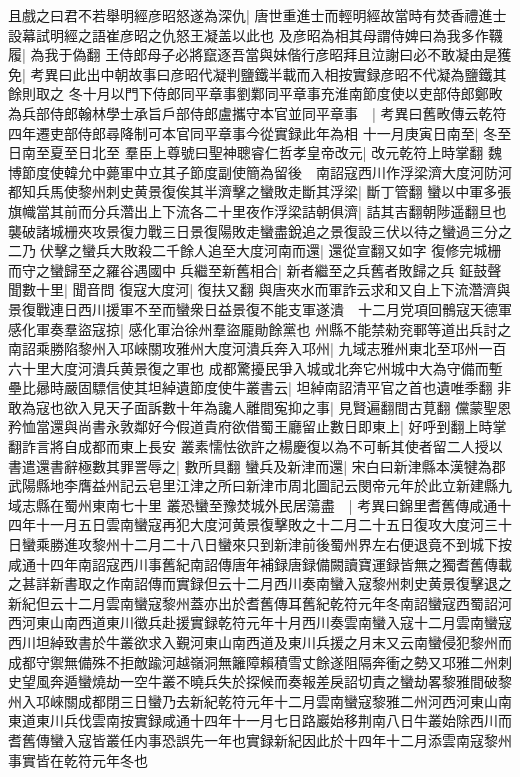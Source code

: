 且戲之曰君不若舉明經彦昭怒遂為深仇|{
	唐世重進士而輕明經故當時有焚香禮進士設幕試明經之語崔彦昭之仇怒王凝盖以此也}
及彦昭為相其母謂侍婢曰為我多作韈履|{
	為我于偽翻}
王侍郎母子必將竄逐吾當與妹偕行彦昭拜且泣謝曰必不敢凝由是獲免|{
	考異曰此出中朝故事曰彦昭代凝判鹽鐵半載而入相按實録彦昭不代凝為鹽鐵其餘則取之}
冬十月以門下侍郎同平章事劉鄴同平章事充淮南節度使以吏部侍郎鄭畋為兵部侍郎翰林學士承旨戶部侍郎盧攜守本官並同平章事　|{
	考異曰舊畋傳云乾符四年遷吏部侍郎尋降制可本官同平章事今從實録此年為相}
十一月庚寅日南至|{
	冬至日南至夏至日北至}
羣臣上尊號曰聖神聰睿仁哲孝皇帝改元|{
	改元乾符上時掌翻}
魏博節度使韓允中薨軍中立其子節度副使簡為留後　南詔寇西川作浮梁濟大度河防河都知兵馬使黎州刺史黄景復俟其半濟擊之蠻敗走斷其浮梁|{
	斷丁管翻}
蠻以中軍多張旗幟當其前而分兵濳出上下流各二十里夜作浮梁詰朝俱濟|{
	詰其吉翻朝陟遥翻旦也}
襲破諸城栅夾攻景復力戰三日景復陽敗走蠻盡銳追之景復設三伏以待之蠻過三分之二乃伏擊之蠻兵大敗殺二千餘人追至大度河南而還|{
	還從宣翻又如字}
復修完城栅而守之蠻歸至之羅谷遇國中兵繼至新舊相合|{
	新者繼至之兵舊者敗歸之兵}
鉦鼓聲聞數十里|{
	聞音問}
復寇大度河|{
	復扶又翻}
與唐夾水而軍詐云求和又自上下流濳濟與景復戰連日西川援軍不至而蠻衆日益景復不能支軍遂潰　十二月党項回鶻寇天德軍　感化軍奏羣盜寇掠|{
	感化軍治徐州羣盜龎勛餘黨也}
州縣不能禁勑兖鄆等道出兵討之　南詔乘勝陷黎州入邛崍關攻雅州大度河潰兵奔入邛州|{
	九域志雅州東北至邛州一百六十里大度河潰兵黄景復之軍也}
成都驚擾民爭入城或北奔它州城中大為守備而塹壘比曏時嚴固驃信使其坦綽遺節度使牛叢書云|{
	坦綽南詔清平官之首也遺唯季翻}
非敢為寇也欲入見天子面訴數十年為讒人離間寃抑之事|{
	見賢遍翻間古莧翻}
儻蒙聖恩矜恤當還與尚書永敦鄰好今假道貴府欲借蜀王廳留止數日即東上|{
	好呼到翻上時掌翻詐言將自成都而東上長安}
叢素懦怯欲許之楊慶復以為不可斬其使者留二人授以書遣還書辭極數其罪詈辱之|{
	數所具翻}
蠻兵及新津而還|{
	宋白曰新津縣本漢犍為郡武陽縣地李膺益州記云皂里江津之所曰新津市周北圖記云閔帝元年於此立新建縣九域志縣在蜀州東南七十里}
叢恐蠻至豫焚城外民居蕩盡　|{
	考異曰錦里耆舊傳咸通十四年十一月五日雲南蠻寇再犯大度河黄景復擊敗之十二月二十五日復攻大度河三十日蠻乘勝進攻黎州十二月二十八日蠻來只到新津前後蜀州界左右便退竟不到城下按咸通十四年南詔寇西川事舊紀南詔傳唐年補録唐録備闕讀寶運録皆無之獨耆舊傳載之甚詳新書取之作南詔傳而實録但云十二月西川奏南蠻入寇黎州刺史黄景復擊退之新紀但云十二月雲南蠻寇黎州蓋亦出於耆舊傳耳舊紀乾符元年冬南詔蠻寇西蜀詔河西河東山南西道東川徵兵赴援實録乾符元年十月西川奏雲南蠻入寇十二月雲南蠻寇西川坦綽致書於牛叢欲求入覲河東山南西道及東川兵援之月末又云南蠻侵犯黎州而成都守禦無備殊不拒敵踰河越嶺洞無籬障賴積雪丈餘遂阻隔奔衝之勢又邛雅二州刺史望風奔遁蠻燒劫一空牛叢不曉兵失於探候而奏報差戾詔切責之蠻劫畧黎雅間破黎州入邛崍關成都閉三日蠻乃去新紀乾符元年十二月雲南蠻寇黎雅二州河西河東山南東道東川兵伐雲南按實録咸通十四年十一月七日路巖始移荆南八日牛叢始除西川而耆舊傳蠻入寇皆叢任内事恐誤先一年也實録新紀因此於十四年十二月添雲南寇黎州事實皆在乾符元年冬也}
